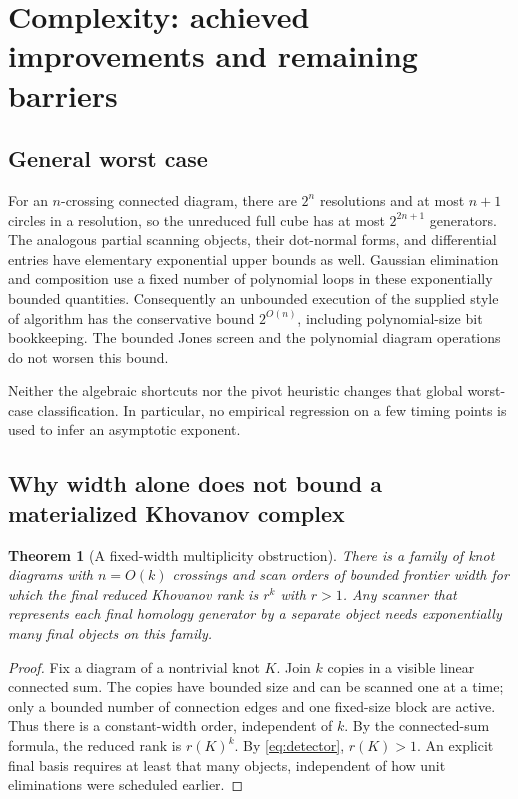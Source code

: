\documentclass[11pt,a4paper]{article}
\newtheorem{theorem}{Theorem}[section]
\theoremstyle{definition}\newtheorem{remark}[theorem]{Remark}
\begin{document}
\section{Complexity: achieved improvements and remaining barriers}
\label{sec:complexity}
\subsection{General worst case}
For an $n$-crossing connected diagram, there are $2^n$ resolutions and at most
$n+1$ circles in a resolution, so the unreduced full cube has at most
$2^{2n+1}$ generators. The analogous partial scanning objects, their dot-normal
forms, and differential entries have elementary exponential upper bounds as
well. Gaussian elimination and composition use a fixed number of polynomial
loops in these exponentially bounded quantities. Consequently an unbounded
execution of the supplied style of algorithm has the conservative bound
$2^{O(n)}$, including polynomial-size bit bookkeeping. The bounded Jones screen
and the polynomial diagram operations do not worsen this bound.

Neither the algebraic shortcuts nor the pivot heuristic changes that global
worst-case classification. In particular, no empirical regression on a few timing
points is used to infer an asymptotic exponent.

\subsection{Why width alone does not bound a materialized Khovanov complex}
\begin{theorem}[A fixed-width multiplicity obstruction]
There is a family of knot diagrams with $n=O(k)$ crossings and scan orders of
bounded frontier width for which the final reduced Khovanov rank is $r^k$ with
$r>1$. Any scanner that represents each final homology generator by a separate
object needs exponentially many final objects on this family.
\end{theorem}
\begin{proof}
Fix a diagram of a nontrivial knot $K$. Join $k$ copies in a visible linear
connected sum. The copies have bounded size and can be scanned one at a time;
only a bounded number of connection edges and one fixed-size block are active.
Thus there is a constant-width order, independent of $k$. By the connected-sum
formula, the reduced rank is $r(K)^k$. By \eqref{eq:detector}, $r(K)>1$.
An explicit final basis requires at least that many objects, independent of how
unit eliminations were scheduled earlier.
\end{proof}
\end{document}
